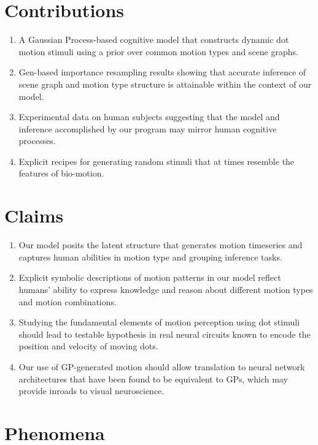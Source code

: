 \documentclass{scrartcl}
\begin{document}
\section*{Contributions}

\begin{enumerate}
  \item A Gaussian Process-based cognitive model that constructs dynamic dot motion stimuli using a prior over common motion types and scene graphs. \cite{Saad_2019}
  \item Gen-based importance resampling results showing that accurate inference of scene graph and motion type structure is attainable within the context of our model. 
  \item Experimental data on human subjects suggesting that the model and inference accomplished by our program may mirror human cognitive processes.
  \item Explicit recipes for generating random stimuli that at times resemble the features of bio-motion. 

\end{enumerate}    

\section*{Claims}

\begin{enumerate}
  \item Our model posits the latent structure that generates motion timeseries and captures human abilities in motion type and grouping inference tasks.
  \item Explicit symbolic descriptions of motion patterns in our model reflect humans' ability to express knowledge and reason about different motion types and motion combinations.
  \item Studying the fundamental elements of motion perception using dot stimuli should lead to testable hypothesis in real neural circuits known to encode the position and velocity of moving dots. \cite{Bolton_2019}
  \item Our use of GP-generated motion should allow translation to neural network architectures that have been found to be equivalent to GPs, which may provide inroads to visual neuroscience. \cite{Neal_1996}
\end{enumerate}


\section*{Phenomena}
  
\end{document}
